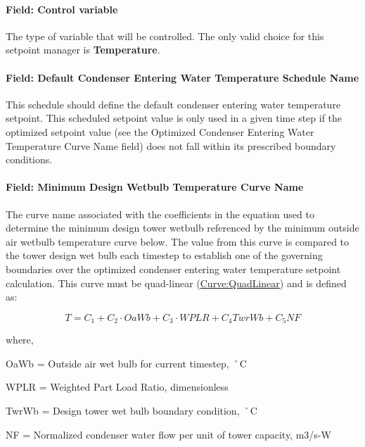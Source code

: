 \paragraph{Field: Control variable}\label{field-control-variable-17}

The type of variable that will be controlled. The only valid choice for this setpoint manager is \textbf{Temperature}.

\paragraph{Field: Default Condenser Entering Water Temperature Schedule Name}\label{field-default-condenser-entering-water-temperature-schedule-name}

This schedule should define the default condenser entering water temperature setpoint. This scheduled setpoint value is only used in a given time step if the optimized setpoint value (see the Optimized Condenser Entering Water Temperature Curve Name field) does not fall within its prescribed boundary conditions.

\paragraph{Field: Minimum Design Wetbulb Temperature Curve Name}\label{field-minimum-design-wetbulb-temperature-curve-name}

The curve name associated with the coefficients in the equation used to determine the minimum design tower wetbulb referenced by the minimum outside air wetbulb temperature curve below. The value from this curve is compared to the tower design wet bulb each timestep to establish one of the governing boundaries over the optimized condenser entering water temperature setpoint calculation. This curve must be quad-linear (\hyperref[curvequadlinear]{Curve:QuadLinear}) and is defined as:

\begin{equation}
T = {C_1} + {C_2}\cdot OaWb + {C_3}\cdot WPLR + {C_4}TwrWb + {C_5}NF
\end{equation}

where,

OaWb = Outside air wet bulb for current timestep, ˚C

WPLR = Weighted Part Load Ratio, dimensionless

TwrWb = Design tower wet bulb boundary condition, ˚C

NF = Normalized condenser water flow per unit of tower capacity, m3/s-W

